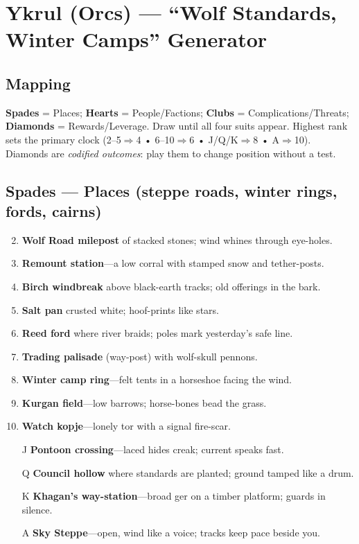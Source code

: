 \chapter{Ykrul (Orcs) --- ``Wolf Standards, Winter Camps'' Generator}

\section*{Mapping}
\textbf{Spades} = Places; \textbf{Hearts} = People/Factions; \textbf{Clubs} = Complications/Threats; \textbf{Diamonds} = Rewards/Leverage. Draw until all four suits appear. Highest rank sets the primary clock (2--5$\Rightarrow$4 • 6--10$\Rightarrow$6 • J/Q/K$\Rightarrow$8 • A$\Rightarrow$10). Diamonds are \emph{codified outcomes}: play them to change position without a test.

\section*{\textbf{Spades} --- Places (steppe roads, winter rings, fords, cairns)}
\begin{enumerate}
\setcounter{enumi}{1}
\item \textbf{Wolf Road milepost} of stacked stones; wind whines through eye-holes.
\item \textbf{Remount station}---a low corral with stamped snow and tether-posts.
\item \textbf{Birch windbreak} above black-earth tracks; old offerings in the bark.
\item \textbf{Salt pan} crusted white; hoof-prints like stars.
\item \textbf{Reed ford} where river braids; poles mark yesterday's safe line.
\item \textbf{Trading palisade} (way-post) with wolf-skull pennons.
\item \textbf{Winter camp ring}---felt tents in a horseshoe facing the wind.
\item \textbf{Kurgan field}---low barrows; horse-bones bead the grass.
\item \textbf{Watch kopje}---lonely tor with a signal fire-scar.
\item[J] \textbf{Pontoon crossing}---laced hides creak; current speaks fast.
\item[Q] \textbf{Council hollow} where standards are planted; ground tamped like a drum.
\item[K] \textbf{Khagan's way-station}---broad ger on a timber platform; guards in silence.
\item[A] \textbf{Sky Steppe}---open, wind like a voice; tracks keep pace beside you.
\end{enumerate}

